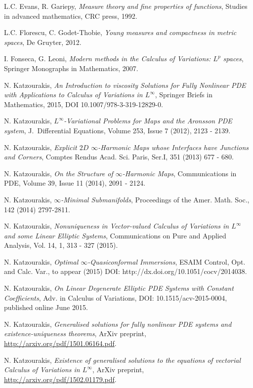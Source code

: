 \documentclass{amsart}
\theoremstyle{definition}
\numberwithin{equation}{section}
\begin{document}
\begin{thebibliography}{30}
 L.C. Evans, R. Gariepy, \emph{Measure theory and fine properties of functions}, Studies in advanced mathematics, CRC press, 1992.

 L.C. Florescu, C. Godet-Thobie, \emph{Young measures and compactness in metric spaces}, De Gruyter, 2012.

 I. Fonseca, G. Leoni, \emph{Modern methods in the Calculus of Variations: $L^p$ spaces}, Springer Monographs in Mathematics, 2007.

 N. Katzourakis, \emph{An Introduction to viscosity Solutions for Fully Nonlinear PDE with Applications to Calculus of Variations in $L^\infty$}, Springer Briefs in Mathematics, 2015, DOI 10.1007/978-3-319-12829-0.

 N. Katzourakis,  \emph{$L^\infty$-Variational Problems for Maps and the Aronsson PDE system}, J.\ Differential Equations, Volume 253, Issue 7 (2012), 2123 - 2139.

 N. Katzourakis,  \emph{Explicit $2D$ $\infty$-Harmonic Maps whose Interfaces have Junctions and Corners}, Comptes Rendus Acad. Sci. Paris, Ser.I, 351 (2013) 677 - 680.

 N. Katzourakis,  \emph{On the Structure of $\infty$-Harmonic Maps}, Communications in PDE, Volume 39, Issue 11 (2014), 2091 - 2124.

 N. Katzourakis, \emph{$\infty$-Minimal Submanifolds}, Proceedings of the Amer. Math. Soc., 142 (2014) 2797-2811.

 N. Katzourakis,  \emph{Nonuniqueness in Vector-valued Calculus of Variations in $L^\infty$ and some Linear Elliptic Systems}, Communications on Pure and Applied Analysis,  Vol. 14, 1, 313 - 327 (2015). 

 N. Katzourakis,   \emph{Optimal $\infty$-Quasiconformal Immersions}, ESAIM Control, Opt. and Calc. Var., to appear (2015) DOI: http://dx.doi.org/10.1051/cocv/2014038. 

 N. Katzourakis,  \emph{On Linear Degenerate Elliptic PDE Systems with Constant Coefficients}, Adv. in Calculus of Variations, DOI: 10.1515/acv-2015-0004, published online June 2015.

 N. Katzourakis,  \emph{Generalised solutions for fully nonlinear PDE systems and existence-uniqueness theorems}, ArXiv preprint, \url{http://arxiv.org/pdf/1501.06164.pdf}. 

 N. Katzourakis,  \emph{Existence of generalised solutions to the equations of vectorial Calculus of Variations in $L^\infty$}, ArXiv preprint, \url{http://arxiv.org/pdf/1502.01179.pdf}. 


\end{thebibliography}
\end{document}
